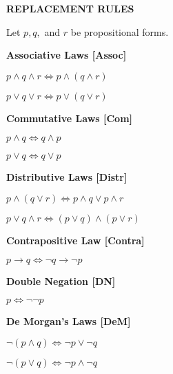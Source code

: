 \documentclass[12pt, a4paper]{article}
\begin{document}
\begin{flushleft}

\blacksquare \textbf{ REPLACEMENT RULES }

\vspace{4mm}

\hspace{4mm} Let $p,q,$ and $r$ be propositional forms. 

\begin{description}

    \item \bullet \textbf{ Associative Laws [Assoc] }\par\hspace{15mm}
    $p\wedge q\wedge r\Leftrightarrow p\wedge(q\wedge r)$\par\hspace{15mm}
    $p\vee q\vee r\Leftrightarrow p\vee(q\vee r)$
    
    \item \bullet \textbf{ Commutative Laws [Com] }\par\hspace{15mm}
    $p\wedge q\Leftrightarrow q\wedge p$\par\hspace{15mm}
    $p\vee q\Leftrightarrow q\vee p$
    
    \item \bullet \textbf{ Distributive Laws [Distr] }\par\hspace{15mm}
    $p\wedge(q\vee r)\Leftrightarrow p\wedge q\vee p\wedge r$\par\hspace{15mm}
    $p\vee q\wedge r\Leftrightarrow (p\vee q)\wedge(p\vee r)$
    
    \item \bullet \textbf{ Contrapositive Law [Contra] }\par\hspace{15mm}
    $p\to q\Leftrightarrow\neg q\to\neg p$\par\hspace{15mm}
    
    \item \bullet \textbf{ Double Negation [DN] }\par\hspace{15mm}
    $p\Leftrightarrow\neg\neg p$\par\hspace{15mm}
    
    \item \bullet \textbf{ De Morgan's Laws [DeM] }\par\hspace{15mm}
    $\neg(p\wedge q)\Leftrightarrow\neg p\vee\neg q$\par\hspace{15mm}
    $\neg(p\vee q)\Leftrightarrow\neg p\wedge\neg q$
    

\end{description}
\end{flushleft}
\end{document}
